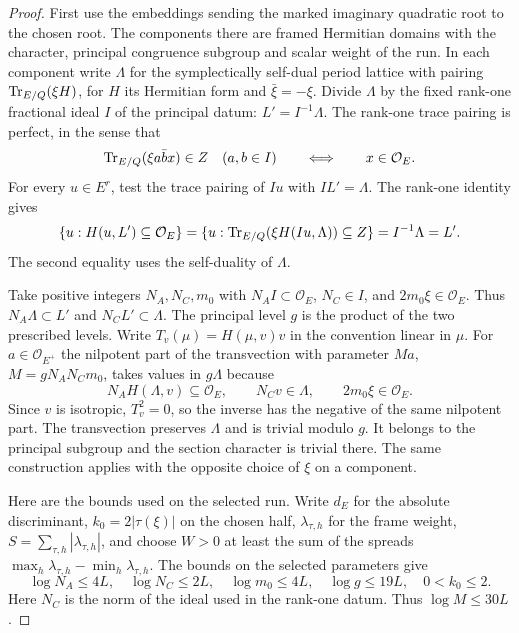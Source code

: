 \begin{proof}
First use the embeddings sending the marked imaginary
quadratic root to the chosen root. The components there are
framed Hermitian domains with the character, principal
congruence subgroup and scalar weight of the run. In each
component write \(\Lambda\) for the symplectically self-dual
period lattice with pairing
\(\operatorname{Tr}_{E/Q}(\xi H)\), for \(H\) its Hermitian
form and \(\bar\xi=-\xi\). Divide \(\Lambda\) by the fixed
rank-one fractional ideal \(I\) of the principal datum:
\(L'=I^{-1}\Lambda\). The rank-one trace pairing is perfect,
in the sense that
\[
 \operatorname{Tr}_{E/Q}(\xi a\bar b x)\in Z
 \quad(a,b\in I)\qquad\Longleftrightarrow\qquad x\in\mathcal O_E.
\]
For every \(u\in E^r\), test the trace pairing of \(Iu\) with
\(I L'=\Lambda\). The rank-one identity gives
\[
 \{u:H(u,L')\subseteq\mathcal O_E\}
   =\{u:\operatorname{Tr}_{E/Q}(\xi H(Iu,\Lambda))
                        \subseteq Z\}
   = I^{-1}\Lambda = L'.
\]
The second equality uses the self-duality of \(\Lambda\).

Take positive integers
\(N_A,N_C,m_0\) with \(N_AI\subset\mathcal O_E\),
\(N_C\in I\), and \(2m_0\xi\in\mathcal O_E\).
Thus \(N_A\Lambda\subset L'\) and \(N_C L'\subset\Lambda\).
The principal level \(g\) is the product of the two prescribed levels. Write \(T_v(\mu)=H(\mu,v)v\) in the convention
linear in \(\mu\). For \(a\in\mathcal O_{E^+}\) the nilpotent
part of the transvection with parameter \(Ma\),
\(M=gN_AN_Cm_0\), takes values in \(g\Lambda\) because
\[
  N_A H(\Lambda,v)\subseteq\mathcal O_E,\qquad
  N_C v\in\Lambda,\qquad 2m_0\xi\in\mathcal O_E .
\]
Since \(v\) is isotropic, \(T_v^2=0\), so the inverse has the
negative of the same nilpotent part. The transvection preserves
\(\Lambda\) and is trivial modulo \(g\). It belongs to the
principal subgroup and the section character is trivial
there. The same construction applies with the opposite
choice of \(\xi\) on a component.

Here are the bounds used on the selected run. Write \(d_E\)
for the absolute discriminant, \(k_0=2|\tau(\xi)|\) on the
chosen half, \(\lambda_{\tau,h}\) for the frame weight,
\(S=\sum_{\tau,h}|\lambda_{\tau,h}|\), and choose
\(W>0\) at least the sum of the spreads
\(\max_h\lambda_{\tau,h}-\min_h\lambda_{\tau,h}\).
The bounds on the selected parameters give
\begin{equation}\label{eq:slice-net-run-sizes}
 \log N_A\le4L,\quad \log N_C\le2L,\quad
 \log m_0\le4L,\quad \log g\le19L,\quad 0<k_0\le2 .
\end{equation}
Here \(N_C\) is the norm of the ideal used in the rank-one
datum. Thus \(\log M\le30L\).


\end{proof}

